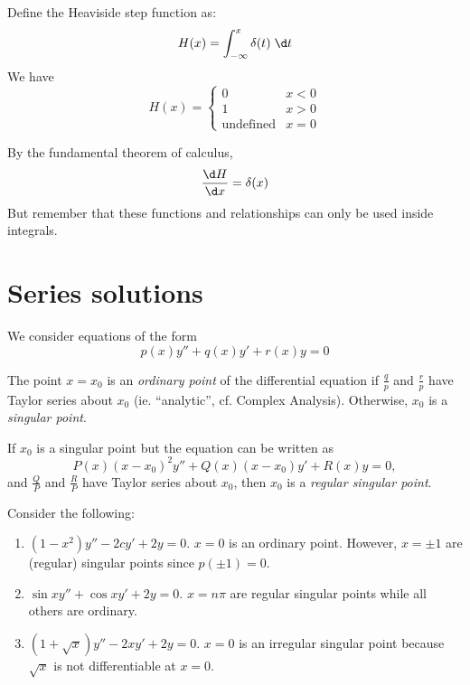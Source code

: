 \documentclass[a4paper]{article}
\begin{document}
  \begin{defi}
    Define the Heaviside step function as:
    \[
      H(x) = \int_{-\infty}^x \delta(t) \;\d t
    \]
    We have
    \[
      H(x) =\begin{cases} 0 & x < 0\\1 & x > 0\\\text{undefined} & x = 0\end{cases}
    \]


    By the fundamental theorem of calculus, 
    \[
      \frac{\d H}{\d x} = \delta(x)
    \]
    But remember that these functions and relationships can only be used inside integrals.
  \end{defi}

  \section{Series solutions}
  We consider equations of the form 
  \[
    p(x) y'' + q(x) y' + r(x) y = 0
  \]

  \begin{defi}
    The point $x = x_0$ is an \emph{ordinary point} of the differential equation if $\frac{q}{p}$ and $\frac{r}{p}$ have Taylor series about $x_0$ (ie. ``analytic'', cf. Complex Analysis). Otherwise, $x_0$ is a \emph{singular point}.

    If $x_0$ is a singular point but the equation can be written as
    \[
      P(x)(x - x_0)^2y'' + Q(x)(x - x_0)y' + R(x)y = 0,
    \]
    and $\frac{Q}{P}$ and $\frac{R}{P}$ have Taylor series about $x_0$, then $x_0$ is a \emph{regular singular point}.
  \end{defi}

  \begin{eg}
    Consider the following:
    \begin{enumerate}
      \item $(1 - x^2)y'' - 2cy' + 2y = 0$. $x = 0$ is an ordinary point. However, $x = \pm 1$ are (regular) singular points since $p(\pm 1) = 0$.
      \item $\sin x y'' + \cos x y' + 2y = 0$. $x = n\pi$ are regular singular points while all others are ordinary.
      \item $(1 + \sqrt{x}) y'' - 2xy' + 2y = 0$. $x = 0$ is an irregular singular point because $\sqrt{x}$ is not differentiable at $x = 0$.
    \end{enumerate}
  \end{eg}
\end{document}
